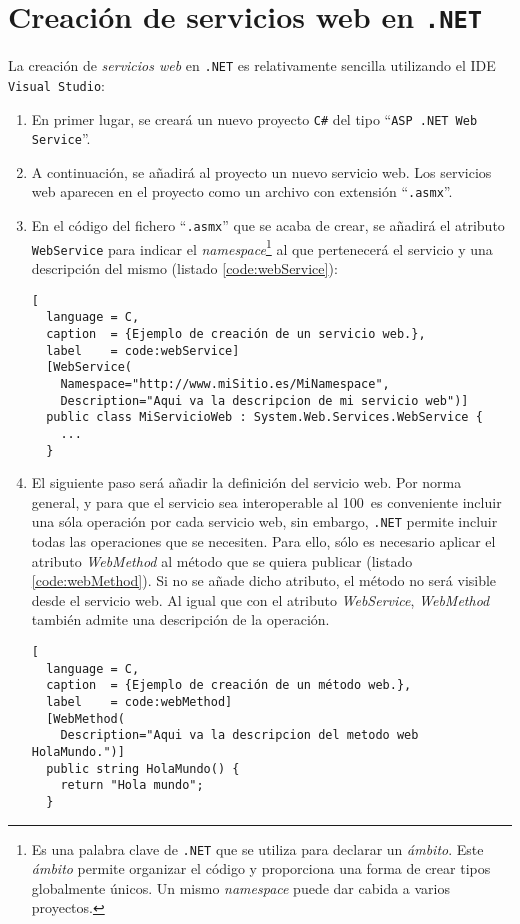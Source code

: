 \chapter{Creación de servicios web en \texttt{.NET}}
\label{chap:webServices}

La creación de \emph{servicios web} en \texttt{.NET} es relativamente sencilla
utilizando el  \acs{IDE} \texttt{Visual Studio}:
\begin{enumerate}
\item En primer lugar, se creará un nuevo proyecto \texttt{C\#} del tipo
``\texttt{ASP .NET Web Service}''.
\item A continuación, se añadirá al proyecto un nuevo servicio web. Los
servicios web aparecen en el proyecto como un archivo con extensión
``\texttt{.asmx}''.
\item En el código del fichero ``\texttt{.asmx}'' que se acaba de crear, se
añadirá el atributo \texttt{WebService} para indicar el
\emph{namespace}\footnote{Es una palabra clave de \texttt{.NET} que se utiliza
para declarar un \emph{ámbito}. Este \emph{ámbito} permite organizar el código
y proporciona una forma de crear tipos globalmente únicos. Un mismo
\emph{namespace} puede dar cabida a varios proyectos.} al que pertenecerá el
servicio y una descripción del mismo (listado \ref{code:webService}):

\begin{lstlisting}[
  language = C,
  caption  = {Ejemplo de creación de un servicio web.},
  label    = code:webService]
  [WebService(
    Namespace="http://www.miSitio.es/MiNamespace",
    Description="Aqui va la descripcion de mi servicio web")]
  public class MiServicioWeb : System.Web.Services.WebService {
    ...
  }
\end{lstlisting}

\item El siguiente paso será añadir la definición del servicio web. Por norma
general, y para que el servicio sea interoperable al 100\, es conveniente
incluir una sóla operación por cada servicio web, sin embargo, \texttt{.NET}
permite incluir todas las operaciones que se necesiten. Para ello, sólo es
necesario aplicar el atributo \emph{WebMethod} al método que se quiera publicar
(listado \ref{code:webMethod}). Si no se añade dicho atributo, el método no
será visible desde el servicio web. Al igual que con el atributo
\emph{WebService}, \emph{WebMethod} también admite una descripción de la
operación.

\begin{lstlisting}[
  language = C,
  caption  = {Ejemplo de creación de un método web.},
  label    = code:webMethod]
  [WebMethod(
    Description="Aqui va la descripcion del metodo web HolaMundo.")]
  public string HolaMundo() {
    return "Hola mundo";
  }
\end{lstlisting}


\end{enumerate}
